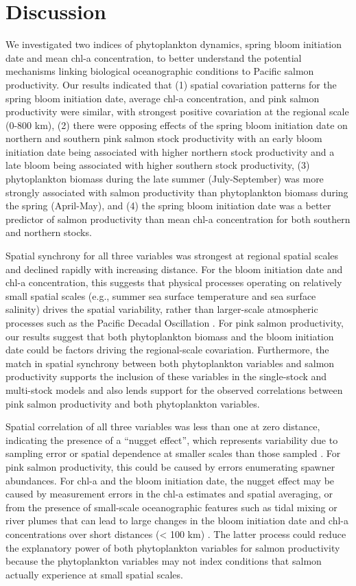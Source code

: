 \section{Discussion}

We investigated two indices of phytoplankton dynamics, spring bloom initiation
date and mean chl-a concentration, to better understand the potential mechanisms
linking biological oceanographic conditions to Pacific salmon productivity. Our
results indicated that (1) spatial covariation patterns for the spring bloom
initiation date, average chl-a concentration, and pink salmon productivity were
similar, with strongest positive covariation at the regional scale (0-800 km),
(2) there were opposing effects of the spring bloom initiation date on northern
and southern pink salmon stock productivity with an early bloom initiation date
being associated with higher northern stock productivity and a late bloom being
associated with higher southern stock productivity, (3) phytoplankton biomass
during the late summer (July-September) was more strongly associated with salmon
productivity than phytoplankton biomass during the spring (April-May), and (4)
the spring bloom initiation date was a better predictor of salmon productivity
than mean chl-a concentration for both southern and northern stocks.

Spatial synchrony for all three variables was strongest at regional spatial
scales and declined rapidly with increasing distance. For the bloom initiation
date and chl-a concentration, this suggests that physical processes operating on
relatively small spatial scales (e.g., summer sea surface temperature and sea
surface salinity) drives the spatial variability, rather than larger-scale
atmospheric processes such as the Pacific Decadal Oscillation
\citep{Mueter2002b}. For pink salmon productivity, our results suggest that both
phytoplankton biomass and the bloom initiation date could be factors driving the
regional-scale covariation. Furthermore, the match in spatial synchrony between
both phytoplankton variables and salmon productivity supports the inclusion of
these variables in the single-stock and multi-stock models and also lends
support for the observed correlations between pink salmon productivity and both
phytoplankton variables.

Spatial correlation of all three variables was less than one at zero distance,
indicating the presence of a ``nugget effect'', which represents variability due
to sampling error or spatial dependence at smaller scales than those sampled
\citep{Cressie1993}. For pink salmon productivity, this could be caused by
errors enumerating spawner abundances. For chl-a and the bloom initiation date,
the nugget effect may be caused by measurement errors in the chl-a estimates and
spatial averaging, or from the presence of small-scale oceanographic features
such as tidal mixing or river plumes that can lead to large changes in the bloom
initiation date and chl-a concentrations over short distances (\textless{} 100
km) \citep{Henson2007a}. The latter process could reduce the explanatory power
of both phytoplankton variables for salmon productivity because the
phytoplankton variables may not index conditions that salmon actually experience
at small spatial scales.

